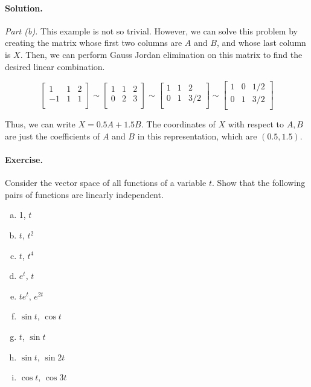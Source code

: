 \documentclass[12pt, titlepage]{article}
\newenvironment{exercise}{\paragraph{Exercise.}}{}
\newenvironment{solution}{\paragraph{Solution.}}{}
\begin{document}
\begin{solution}
  \textit{Part (b).} This example is not so trivial. However, we can solve this
  problem by creating the matrix whose first two columns are $A$ and $B$, and
  whose last column is $X$. Then, we can perform Gauss Jordan elimination on
  this matrix to find the desired linear combination.

  \[
    \begin{bmatrix}
      1  & 1 & 2 \\
      -1 & 1 & 1 \\
    \end{bmatrix}
    \sim \begin{bmatrix}
      1 & 1 & 2 \\
      0 & 2 & 3 \\
    \end{bmatrix}
    \sim \begin{bmatrix}
      1 & 1 & 2   \\
      0 & 1 & 3/2 \\
    \end{bmatrix}
    \sim \begin{bmatrix}
      1 & 0 & 1/2 \\
      0 & 1 & 3/2 \\
    \end{bmatrix}
  \]

  Thus, we can write $X = 0.5A + 1.5B$. The coordinates of $X$
  with respect to $A, B$ are just the coefficients of $A$ and $B$ in this
  representation, which are $(0.5, 1.5)$.
\end{solution}

\begin{exercise}
  Consider the vector space of all functions of a variable $t$. Show that the
  following pairs of functions are linearly independent.

  \begin{multicols}{3}
    \begin{enumerate}[(a), noitemsep]
      \item 1, $t$
      \item $t$, $t^2$
      \item $t$, $t^4$
      \item $e^t$, $t$
      \item $te^t$, $e^{2t}$
      \item $\sin t$, $\cos t$
      \item $t$, $\sin t$
      \item $\sin t$, $\sin 2t$
      \item $\cos t$, $\cos 3t$
    \end{enumerate}
  \end{multicols}
\end{exercise}
\end{document}
